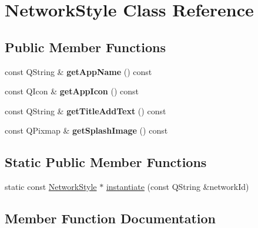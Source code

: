 \hypertarget{class_network_style}{}\section{Network\+Style Class Reference}
\label{class_network_style}
\subsection*{Public Member Functions}
\begin{DoxyCompactItemize}
\item 
\mbox{\label{class_network_style_a1e69804119d442582f04a7f2b9484eea}} 
const Q\+String \& {\bfseries get\+App\+Name} () const
\item 
\mbox{\label{class_network_style_ad91c8a6d8f33741cdbe0ebbd716a36bb}} 
const Q\+Icon \& {\bfseries get\+App\+Icon} () const
\item 
\mbox{\label{class_network_style_a12eab0110656b06afe8ef5dc4cf1f810}} 
const Q\+String \& {\bfseries get\+Title\+Add\+Text} () const
\item 
\mbox{\label{class_network_style_a4a679f7f2d6840ad55de9f5fdb793a79}} 
const Q\+Pixmap \& {\bfseries get\+Splash\+Image} () const
\end{DoxyCompactItemize}
\subsection*{Static Public Member Functions}
\begin{DoxyCompactItemize}
\item 
static const \mbox{\hyperlink{class_network_style}{Network\+Style}} $\ast$ \mbox{\hyperlink{class_network_style_a129099b57a57ec56b524a7688b054aeb}{instantiate}} (const Q\+String \&network\+Id)
\end{DoxyCompactItemize}


\subsection{Member Function Documentation}
\mbox{\label{class_network_style_a129099b57a57ec56b524a7688b054aeb}} 
